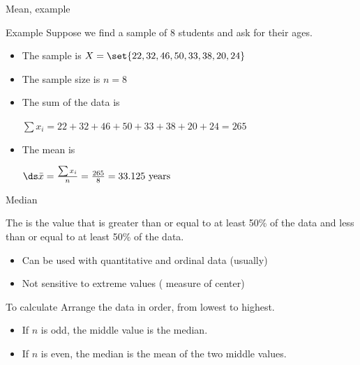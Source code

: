 \documentclass[xcolor=table, aspectratio=169, bigger, handout]{beamer}
\begin{document}
\begin{frame}{Mean, example}
\begin{exampleblock}{Example}
Suppose we find a sample of 8 students and ask for their ages. 

\begin{itemize}
\item The sample is $X = \set{22, 32, 46, 50, 33, 38, 20, 24}$
\pause\item The sample size is $n=8$
\pause
\item The sum of the data is\\
\smallskip
{\centering
$\sum x_i = 22 + 32 + 46 + 50 + 33 +  38 + 20 + 24 = 265$
\par}
\pause
\item The mean is\\
\smallskip
{\centering
$\ds \bar x = \frac {\sum x_i}{n} = \frac {265} 8 = 33.125 \text{ years}$
\par}
\end{itemize}
\smallskip
\end{exampleblock}
\end{frame}

\begin{frame}{Median}
\begin{block}{}
The  is the value that is greater than or equal to at least 50\% of the data and less than or equal to at least 50\% of the data.
\begin{itemize}
\item Can be used with quantitative and ordinal data (usually)
\item Not sensitive to extreme values ( measure of center)
\end{itemize}
\end{block}

\pause
\begin{block}{To calculate}
Arrange the data in order, from lowest to highest.
\begin{itemize}
\item If $n$ is odd, the middle value is the median.
\item If $n$ is even, the median is the mean of the two middle values.
\end{itemize}
\end{block}
\end{frame}
\end{document}
